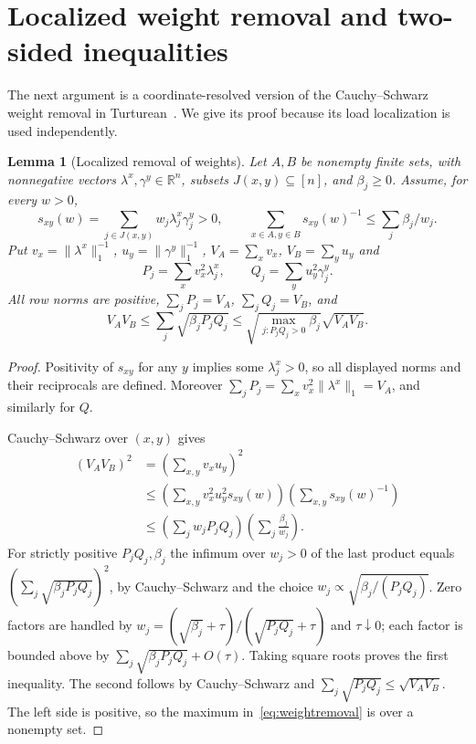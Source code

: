 \documentclass[11pt]{article}
\numberwithin{equation}{section}
\newtheorem{lemma}[theorem]{Lemma}
\theoremstyle{remark}
\newcommand{\R}{\mathbb R}
\newcommand{\norm}[1]{\lVert #1\rVert}
\begin{document}
\section{Localized weight removal and two-sided inequalities}\label{sec:local}
The next argument is a coordinate-resolved version of the Cauchy--Schwarz weight removal in Turturean~\cite[Lemma~5.3]{Tur26}. We give its proof because its load localization is used independently.

\begin{lemma}[Localized removal of weights]\label{lem:wr}
Let $A,B$ be nonempty finite sets, with nonnegative vectors $\lambda^x,\gamma^y\in\R^n$, subsets $J(x,y)\subseteq[n]$, and $\beta_j\ge0$. Assume, for every $w>0$,
\[
 s_{xy}(w)=\sum_{j\in J(x,y)}w_j\lambda_j^x\gamma_j^y>0,
 \qquad \sum_{x\in A,y\in B}s_{xy}(w)^{-1}\le\sum_j\beta_j/w_j.
\]
Put $v_x=\norm{\lambda^x}_1^{-1}$, $u_y=\norm{\gamma^y}_1^{-1}$, $V_A=\sum_xv_x$, $V_B=\sum_yu_y$ and
\[
 P_j=\sum_xv_x^2\lambda_j^x,\qquad Q_j=\sum_yu_y^2\gamma_j^y.
\]
All row norms are positive, $\sum_jP_j=V_A$, $\sum_jQ_j=V_B$, and
\begin{equation}\label{eq:weightremoval}
 V_AV_B\le\sum_j\sqrt{\beta_jP_jQ_j}
 \le\sqrt{\max_{j:P_jQ_j>0}\beta_j}\sqrt{V_AV_B}.
\end{equation}
\end{lemma}
\begin{proof}
Positivity of $s_{xy}$ for any $y$ implies some $\lambda_j^x>0$, so all displayed norms and their reciprocals are defined. Moreover $\sum_jP_j=\sum_xv_x^2\norm{\lambda^x}_1=V_A$, and similarly for $Q$.

Cauchy--Schwarz over $(x,y)$ gives
\begin{align*}
 (V_AV_B)^2
 &=\left(\sum_{x,y}v_xu_y\right)^2\\
 &\le\left(\sum_{x,y}v_x^2u_y^2s_{xy}(w)\right)
       \left(\sum_{x,y}s_{xy}(w)^{-1}\right)\\
 &\le\left(\sum_jw_jP_jQ_j\right)
       \left(\sum_j\frac{\beta_j}{w_j}\right).
\end{align*}
For strictly positive $P_jQ_j,\beta_j$ the infimum over $w_j>0$ of the last product equals $(\sum_j\sqrt{\beta_jP_jQ_j})^2$, by Cauchy--Schwarz and the choice $w_j\propto\sqrt{\beta_j/(P_jQ_j)}$. Zero factors are handled by $w_j=(\sqrt{\beta_j}+\tau)/(\sqrt{P_jQ_j}+\tau)$ and $\tau\downarrow0$; each factor is bounded above by $\sum_j\sqrt{\beta_jP_jQ_j}+O(\tau)$. Taking square roots proves the first inequality. The second follows by Cauchy--Schwarz and $\sum_j\sqrt{P_jQ_j}\le\sqrt{V_AV_B}$. The left side is positive, so the maximum in~\eqref{eq:weightremoval} is over a nonempty set.
\end{proof}
\end{document}
